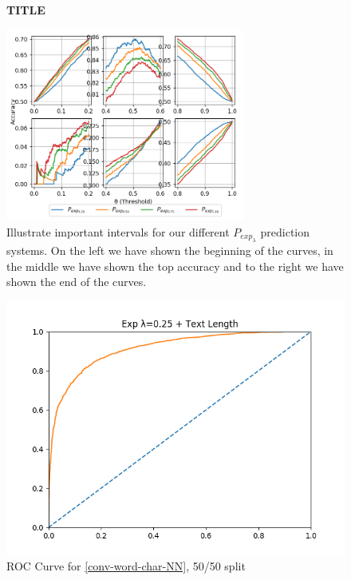 \begin{description}
        \begin{figure}
            \centering
            \textbf{TITLE}\par\medskip
            \includegraphics[width=0.7\textwidth]{./pictures/discussion/conv_char_nn_prediction_zoom.png}
            \caption{Illustrate important intervals for our different
            $P_{exp_\lambda}$ prediction systems. On the left we have shown the
            beginning of the curves, in the middle we have shown the top
            accuracy and to the right we have shown the end of the curves.}
            \label{fig:conv_char_prediction_zoom}
        \end{figure}

\end{description}


\begin{figure}
\centering
\includegraphics[width=\textwidth]{./Figure_2.png}
\caption{ROC Curve for \ref{conv-word-char-NN}, 50/50 split}
\end{figure}

